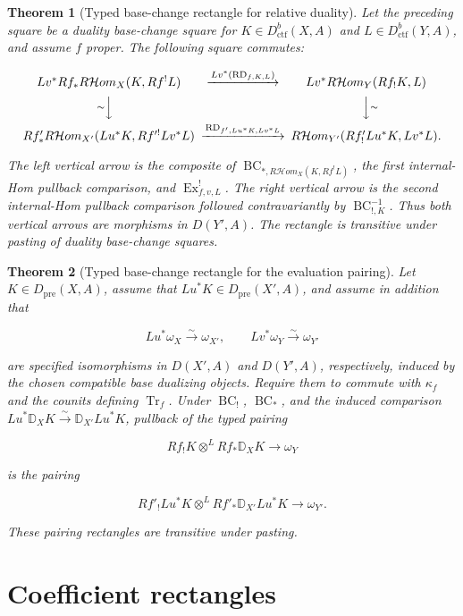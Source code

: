 \documentclass[10pt]{article}
\newtheorem{theorem}{Theorem}[section]
\theoremstyle{definition}
\newcommand{\Dctf}{D^b_{\mathrm{ctf}}}
\newcommand{\RHom}{R\mathcal Hom}
\newcommand{\DD}{\mathbb D}
\newcommand{\Tr}{\operatorname{Tr}}
\begin{document}
\begin{theorem}[Typed base-change rectangle for relative duality]
Let the preceding square be a duality base-change square for
\(K\in\Dctf(X,A)\) and \(L\in\Dctf(Y,A)\), and assume \(f\) proper.  The
following square commutes:

\[
\begin{CD}
Lv^*Rf_*\RHom_X(K,Rf^!L)
 @>{Lv^*(\operatorname{RD}_{f,K,L})}>>
Lv^*\RHom_Y(Rf_!K,L)\\
@V{\sim}VV @VV{\sim}V\\
Rf'_*\RHom_{X'}(Lu^*K,Rf'^!Lv^*L)
 @>{\operatorname{RD}_{f',Lu^*K,Lv^*L}}>>
\RHom_{Y'}(Rf'_!Lu^*K,Lv^*L).
\end{CD}
\]

The left vertical arrow is the composite of
\(\operatorname{BC}_{*,\RHom_X(K,Rf^!L)}\), the first internal-Hom pullback
comparison, and \(\operatorname{Ex}^!_{f,v,L}\).  The right vertical arrow is
the second internal-Hom pullback comparison followed contravariantly by
\(\operatorname{BC}_{!,K}^{-1}\).  Thus both vertical arrows are morphisms in
\(D(Y',A)\).  The rectangle is transitive under pasting of duality
base-change squares.
\end{theorem}

\begin{theorem}[Typed base-change rectangle for the evaluation pairing]
Let \(K\in D_{\mathrm{pre}}(X,A)\), assume that
\(Lu^*K\in D_{\mathrm{pre}}(X',A)\), and assume in addition that

\[
 Lu^*\omega_X\xrightarrow{\sim}\omega_{X'},\qquad
 Lv^*\omega_Y\xrightarrow{\sim}\omega_{Y'}
\]

are specified isomorphisms in \(D(X',A)\) and \(D(Y',A)\), respectively,
induced by the chosen compatible base dualizing objects.  Require them to
commute with \(\kappa_f\) and the counits defining \(\Tr_f\).  Under
\(\operatorname{BC}_!\), \(\operatorname{BC}_*\), and the
induced comparison \(Lu^*\DD_XK\xrightarrow{\sim}\DD_{X'}Lu^*K\), pullback
of the typed pairing

\[
 Rf_!K\otimes^LRf_*\DD_XK\longrightarrow\omega_Y
\]

is the pairing

\[
 Rf'_!Lu^*K\otimes^LRf'_*\DD_{X'}Lu^*K\longrightarrow\omega_{Y'}.
\]

These pairing rectangles are transitive under pasting.
\end{theorem}

\section{Coefficient rectangles}
\end{document}
